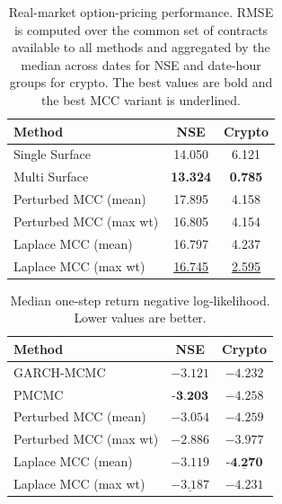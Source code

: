 \documentclass[sigconf,anonymous,review]{acmart}
\begin{document}
\begin{table}[!t]
\centering
\caption{Real-market option-pricing performance. RMSE is computed over the common set of contracts available to all methods and aggregated by the median across dates for NSE and date-hour groups for crypto. The best values are bold and the best MCC variant is underlined.}
\label{tab:real_option_pricing}
\small
\setlength{\tabcolsep}{8pt}
\begin{tabular}{lcc}
\toprule
\textbf{Method}
& \textbf{NSE}
& \textbf{Crypto} \\
\midrule
Single Surface
& 14.050
& 6.121 \\

Multi Surface
& \textbf{13.324}
& \textbf{0.785} \\

Perturbed MCC (mean)
& 17.895
& 4.158 \\

Perturbed MCC (max wt)
& 16.805
& 4.154 \\

Laplace MCC (mean)
& 16.797
& 4.237 \\

Laplace MCC (max wt)
& \underline{16.745}
& \underline{2.595} \\
\bottomrule
\end{tabular}
\vspace{-3pt}
\end{table}

\begin{table}[!t]
\centering
\caption{Median one-step return negative log-likelihood. Lower values are better.}
\label{tab:real_return_nll}
\small
\setlength{\tabcolsep}{7pt}
\begin{tabular}{lcc}
\toprule
\textbf{Method}
& \textbf{NSE}
& \textbf{Crypto} \\
\midrule
GARCH-MCMC
& $-3.121$
& $-4.232$ \\

PMCMC
& $\textbf{-3.203}$
& $-4.258$ \\

Perturbed MCC (mean)
& $-3.054$
& $-4.259$ \\

Perturbed MCC (max wt)
& $-2.886$
& $-3.977$ \\

Laplace MCC (mean)
& $-3.119$
& $\underline{\textbf{-4.270}}$ \\

Laplace MCC (max wt)
& $\underline{-3.187}$
& $-4.231$ \\
\bottomrule
\end{tabular}
\vspace{-3pt}
\end{table}
\end{document}
